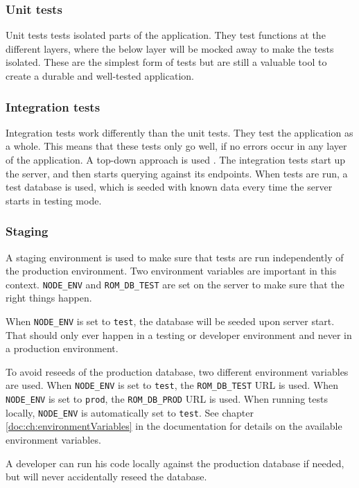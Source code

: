 \subsubsection{Unit tests}
Unit tests tests isolated parts of the application.
They test functions at the different layers, where the below layer will be mocked away to make the tests isolated.
These are the simplest form of tests but are still a valuable tool to create a durable and well-tested application.

\subsubsection{Integration tests}
Integration tests work differently than the unit tests.
They test the application as a whole.
This means that these tests only go well, if no errors occur in any layer of the application.
A top-down approach is used \citep[pp. 662-669]{testing:integration}.
The integration tests start up the  server, and then starts querying against its endpoints.
When tests are run, a test database is used, which is seeded with known data every time the server starts in testing mode.

\subsubsection{Staging}
\label{sec:staging}
A staging environment is used to make sure that tests are run independently of the production environment.
Two environment variables are important in this context.
\verb+NODE_ENV+ and \verb+ROM_DB_TEST+ are set on the  server to make sure that the right things happen.

When \verb+NODE_ENV+ is set to \verb+test+, the database will be seeded upon server start.
That should only ever happen in a testing or developer environment and never in a production environment.

To avoid reseeds of the production database, two different environment variables are used.
When \verb+NODE_ENV+ is set to \verb+test+, the \verb+ROM_DB_TEST+ URL is used.
When \verb+NODE_ENV+ is set to \verb+prod+, the \verb+ROM_DB_PROD+ URL is used.
When running tests locally, \verb+NODE_ENV+ is automatically set to \verb+test+.
See chapter \ref{doc:ch:environmentVariables} in the documentation for details on the available environment variables.

A developer can run his code locally against the production database if needed, but will never accidentally reseed the database.

